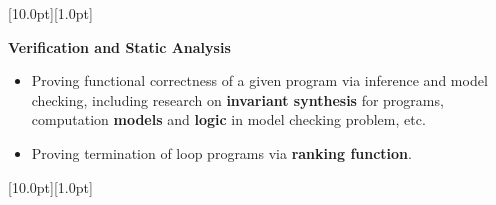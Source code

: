 \documentclass[12pt,a4paper,utf8]{report}
\begin{document}
\begin{minipage}[t]{16cm}
    \colorbox{subtitlecolor}{\raisebox{0pt}[10.0pt][1.0pt]{
        \textcolor{white}{\textsf{}}}}
\end{minipage}\par
\vspace{0.2cm}\hspace{0.5cm}
    \begin{minipage}[t]{15.0cm}
        \textbf{Verification and Static Analysis}\par
        \begin{itemize}
        \item Proving functional correctness of a given program via inference and model checking, including research on \textbf{invariant synthesis} for programs, computation \textbf{models} and \textbf{logic} in model checking problem, etc.
        \item Proving termination of loop programs via \textbf{ranking function}.
		\end{itemize}       
    \end{minipage}\par
\vspace{0.4cm}

\begin{minipage}[t]{16cm}
    \colorbox{subtitlecolor}{\raisebox{0pt}[10.0pt][1.0pt]{
        \textcolor{white}{\textsf{}}}}
\end{minipage}\par
\end{document}
